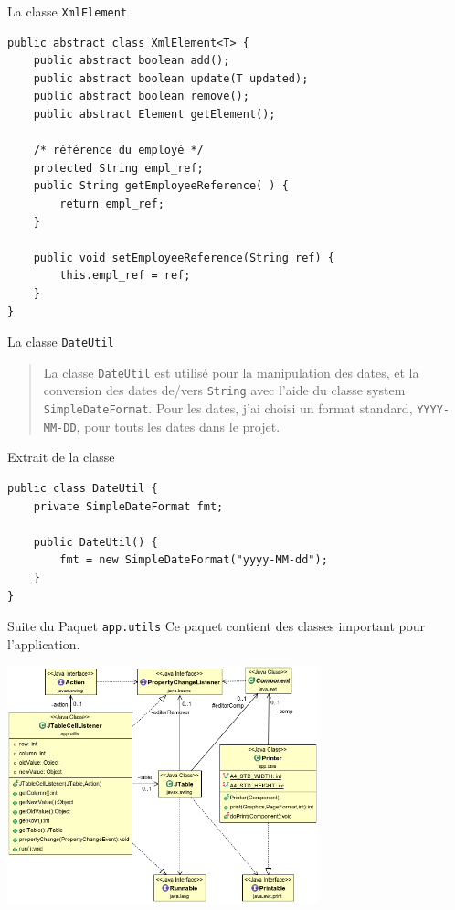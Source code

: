 \documentclass[captions=tableheading]{beamer}
\begin{document}
\begin{frame}[fragile,label={sec:org7342f08}]{La classe \texttt{XmlElement}}
 \begin{verbatim}
public abstract class XmlElement<T> {
    public abstract boolean add();
    public abstract boolean update(T updated);
    public abstract boolean remove();
    public abstract Element getElement();

    /* référence du employé */
    protected String empl_ref;
    public String getEmployeeReference( ) {
        return empl_ref;
    }

    public void setEmployeeReference(String ref) {
        this.empl_ref = ref;
    }
}
\end{verbatim}
\end{frame}

\begin{frame}[fragile,label={sec:orgb62c5ad}]{La classe \texttt{DateUtil}}
 \begin{quote}
La classe \texttt{DateUtil} est utilisé pour la manipulation des dates, et la conversion des dates de/vers \texttt{String} avec l'aide du classe system \texttt{SimpleDateFormat}. Pour les dates, j'ai choisi un format standard, \texttt{YYYY-MM-DD}, pour touts les dates dans le projet.
\end{quote}

\begin{block}{Extrait de la classe}
\begin{verbatim}
public class DateUtil {
    private SimpleDateFormat fmt;

    public DateUtil() {
        fmt = new SimpleDateFormat("yyyy-MM-dd");
    }
}
\end{verbatim}
\end{block}
\end{frame}


\begin{frame}[fragile,label={sec:org200d449}]{Suite du Paquet \texttt{app.utils}}
 Ce paquet contient des classes important pour l'application. \pause
\begin{center}
\includegraphics[width=9cm]{./diags/OverviewAppUtils0.png}
\end{center}
\end{frame}
\end{document}
